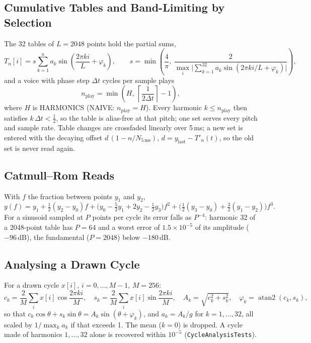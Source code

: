 \documentclass[11pt,letterpaper]{article}
\newcommand{\code}[1]{\texttt{\textcolor{codegray}{#1}}}
\begin{document}
\subsection{Cumulative Tables and Band-Limiting by Selection}

The 32 tables of $L = 2048$ points hold the partial sums,
\begin{equation}\label{eq:tables}
  T_n[i] = s \sum_{k=1}^{n} a_k \sin\!\left(\frac{2\pi k i}{L} + \varphi_k\right), \qquad
  s = \min\!\left(\frac{4}{\pi},\ \frac{2}{\max_i \lvert \sum_{k=1}^{32} a_k \sin(2\pi k i / L + \varphi_k) \rvert}\right),
\end{equation}
and a voice with phase step $\Delta t$ cycles per sample plays
\begin{equation}\label{eq:nplay}
  n_{\mathrm{play}} = \min\!\left(H,\ \left\lceil \frac{1}{2\Delta t} \right\rceil - 1\right),
\end{equation}
where $H$ is HARMONICS (NAIVE: $n_{\mathrm{play}} = H$). Every harmonic $k \le n_{\mathrm{play}}$ then satisfies $k\,\Delta t < \tfrac12$, so the table is
alias-free at that pitch; one set serves every pitch and sample rate. Table changes are crossfaded linearly over 5\,ms; a new
set is entered with the decaying offset $d\,(1 - n/N_{5\,\mathrm{ms}})$, $d = y_{\mathrm{last}} - T'_n(t)$, so the old set is never read again.

\subsection{Catmull--Rom Reads}

With $f$ the fraction between points $y_1$ and $y_2$,
\begin{equation}\label{eq:cr}
  y(f) = y_1 + \tfrac12(y_2 - y_0)f + \bigl(y_0 - \tfrac52 y_1 + 2y_2 - \tfrac12 y_3\bigr)f^2 + \bigl(\tfrac12(y_3 - y_0) + \tfrac32(y_1 - y_2)\bigr)f^3 .
\end{equation}
For a sinusoid sampled at $P$ points per cycle its error falls as $P^{-4}$: harmonic 32 of a 2048-point table has $P = 64$ and a
worst error of $1.5\times10^{-5}$ of its amplitude ($-96$\,dB), the fundamental ($P = 2048$) below $-180$\,dB.

\subsection{Analysing a Drawn Cycle}

For a drawn cycle $x[i]$, $i = 0,\dots,M-1$, $M = 256$:
\begin{equation}\label{eq:dft}
  c_k = \frac{2}{M}\sum_{i} x[i]\cos\frac{2\pi k i}{M}, \quad s_k = \frac{2}{M}\sum_{i} x[i]\sin\frac{2\pi k i}{M}, \quad
  A_k = \sqrt{c_k^2 + s_k^2}, \quad \varphi_k = \operatorname{atan2}(c_k, s_k),
\end{equation}
so that $c_k\cos\theta + s_k\sin\theta = A_k\sin(\theta+\varphi_k)$, and $a_k = A_k / g$ for $k = 1,\dots,32$, all scaled by
$1/\max_k a_k$ if that exceeds 1. The mean ($k = 0$) is dropped. A cycle made of harmonics $1,\dots,32$ alone is recovered
within $10^{-5}$ (\code{CycleAnalysisTests}).
\end{document}
